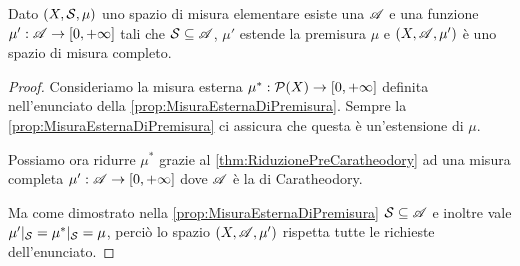 \begin{theorem}\label{thm:EstensioneCaratheodory}
	Dato $(X,\S,\mu)$ uno spazio di misura elementare esiste una \sigalg{} $\A$ e una funzione $\mu':\A\to\Rpiu$ tali che $\S\subseteq \A$, $\mu'$ estende la premisura $\mu$ e $(X,\A,\mu')$ è uno spazio di misura completo.
\end{theorem}
\begin{proof}
	Consideriamo la misura esterna $\mu^*:\mathcal P(X)\to\Rpiu$ definita nell'enunciato della \cref{prop:MisuraEsternaDiPremisura}. Sempre la \cref{prop:MisuraEsternaDiPremisura} ci assicura che questa è un'estensione di $\mu$.
	
	Possiamo ora ridurre $\mu^*$ grazie al \cref{thm:RiduzionePreCaratheodory} ad una misura completa $\mu':\A\to\Rpiu$ dove $\A$ è la \sigalg{} di Caratheodory. 
	
	Ma come dimostrato nella \cref{prop:MisuraEsternaDiPremisura} $\S\subseteq\A$ e inoltre vale $\mu'|_\S=\mu^*|_\S=\mu$, perciò lo spazio $(X,\A,\mu')$ rispetta tutte le richieste dell'enunciato.
\end{proof}


